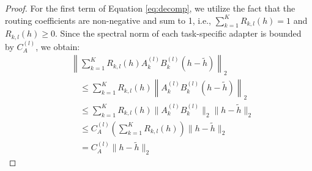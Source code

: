 \begin{proof}
For the first term of Equation \ref{eq:decomp}, we utilize the fact that the routing coefficients are non-negative and sum to 1, i.e., $\sum_{k=1}^K R_{k, l}(h) = 1$ and $R_{k, l}(h) \ge 0$. Since the spectral norm of each task-specific adapter is bounded by $C_A^{(l)}$, we obtain:
\begin{align}
\label{eq:term1_bound}
& \left\| \sum_{k=1}^K R_{k, l}(h) A_k^{(l)} B_k^{(l)} (h - \tilde{h}) \right\|_2 \nonumber \\
& \quad \le \sum_{k=1}^K R_{k, l}(h) \left\| A_k^{(l)} B_k^{(l)} (h - \tilde{h}) \right\|_2 \nonumber \\
& \quad \le \sum_{k=1}^K R_{k, l}(h) \|A_k^{(l)} B_k^{(l)}\|_2 \|h - \tilde{h}\|_2 \nonumber \\
& \quad \le C_A^{(l)} \left( \sum_{k=1}^K R_{k, l}(h) \right) \|h - \tilde{h}\|_2 \nonumber \\
& \quad = C_A^{(l)} \|h - \tilde{h}\|_2
\end{align}


\end{proof}
